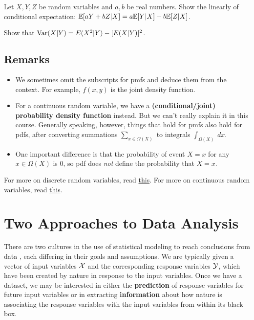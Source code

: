 \documentclass{discussion}
\begin{document}
\vspace{1em}


\begin{exercise}
Let $X,Y,Z$ be random variables and $a,b$ be real numbers. Show the linearly of conditional expectation: $\mathbb{E}[aY + bZ | X] = a\mathbb{E}[Y | X] + b\mathbb{E}[Z | X]$.
\end{exercise}

\vspace{1em}

\begin{exercise}
Show that $\mathrm{Var}(X | Y) = E(X^2 | Y) - [E(X | Y)]^2$.
\end{exercise}

\subsection*{Remarks}
\begin{itemize}
\item We sometimes omit the subscripts for pmfs and deduce them from the context. For example, $f(x,y)$ is the joint density function.
\item For a continuous random variable, we have a \textbf{(conditional/joint) probability density function} instead. But we can't really explain it in this course. Generally speaking, however, things that hold for pmfs also hold for pdfs, after converting summations $\sum_{x \in \Omega(X)}$  to integrals $\int_{\Omega(X)} \ dx$.
\item One important difference is that the probability of event $X = x$ for any $x \in \Omega(X)$ is 0, so pdf does \textit{not} define the probability that $X = x$.
\end{itemize}


For more on discrete random variables, read \href{http://ocw.mit.edu/courses/mathematics/18-05-introduction-to-probability-and-statistics-spring-2014/readings/MIT18_05S14_Reading3.pdf}{this}. For more on continuous random variables, read \href{http://www.math.uah.edu/stat/expect/Conditional.html}{this}.

\section{Two Approaches to Data Analysis}

There are two cultures in the use of statistical modeling to reach conclusions from data \cite{breiman2001}, each differing in their goals and assumptions.  We are typically given a vector of input variables $\mathcal{X}$ and the corresponding response variables $\mathcal{Y}$, which have been created by nature in response to the input variables. Once we have a dataset, we may be interested in either the \textbf{prediction} of response variables for future input variables or in extracting \textbf{information} about how nature is associating the response variables with the input variables from within its black box.
\end{document}
